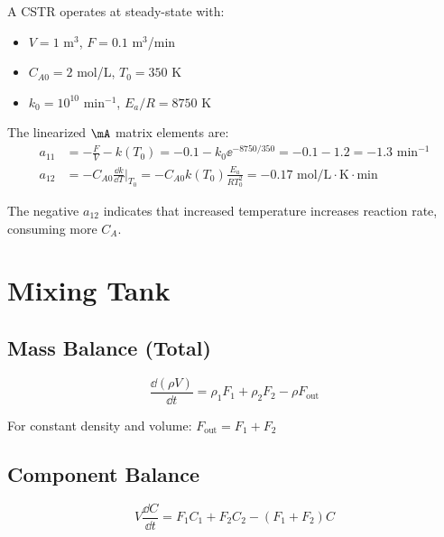 \begin{examplebox}[title=Example 1.12: CSTR Linearization]
A CSTR operates at steady-state with:
\begin{itemize}
    \item $V = 1$ m$^3$, $F = 0.1$ m$^3$/min
    \item $C_{A0} = 2$ mol/L, $T_0 = 350$ K
    \item $k_0 = 10^{10}$ min$^{-1}$, $E_a/R = 8750$ K
\end{itemize}

The linearized $\mA$ matrix elements are:
\begin{align}
a_{11} &= -\frac{F}{V} - k(T_0) = -0.1 - k_0\ee^{-8750/350} = -0.1 - 1.2 = -1.3 \text{ min}^{-1} \\
a_{12} &= -C_{A0}\frac{\dd k}{\dd T}\bigg|_{T_0} = -C_{A0}k(T_0)\frac{E_a}{RT_0^2} = -0.17 \text{ mol/L$\cdot$K$\cdot$min}
\end{align}

The negative $a_{12}$ indicates that increased temperature increases reaction rate, consuming more $C_A$.
\end{examplebox}

\section{Mixing Tank}
\label{sec:mixing}



\subsection{Mass Balance (Total)}

\begin{equation}
\frac{\dd(\rho V)}{\dd t} = \rho_1 F_1 + \rho_2 F_2 - \rho F_{\text{out}}
\end{equation}

For constant density and volume: $F_{\text{out}} = F_1 + F_2$

\subsection{Component Balance}

\begin{equation}
V\frac{\dd C}{\dd t} = F_1 C_1 + F_2 C_2 - (F_1 + F_2)C
\end{equation}

